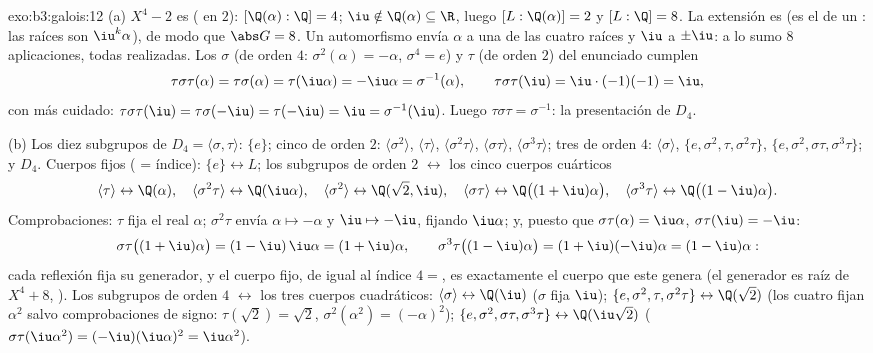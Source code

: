 \begin{solution}{exo:b3:galois:12}
(a) $X^4 - 2$ es 
( en $2$):
$[\Q(\alpha):\Q] = 4$; $\iu \notin \Q(\alpha) \subseteq \R$,
luego $[L : \Q(\alpha)] = 2$ y $[L:\Q] = 8$. La extensión es
 (es el
 de un
: las raíces son
$\iu^k\alpha$), de modo que $\abs G = 8$. Un automorfismo envía $\alpha$
a una de las cuatro raíces y $\iu$ a $\pm\iu$: a lo sumo $8$
aplicaciones, todas realizadas. Los $\sigma$ (de orden $4$:
$\sigma^2(\alpha) = -\alpha$, $\sigma^4 = e$) y $\tau$ (de orden $2$)
del enunciado cumplen
\[
\tau\sigma\tau(\alpha) = \tau\sigma(\alpha) =
\tau(\iu\alpha) = -\iu\alpha = \sigma^{-1}(\alpha),
\qquad \tau\sigma\tau(\iu) = \iu\cdot(-1)(-1) = \iu ,
\]
con más cuidado: $\tau\sigma\tau(\iu) = \tau\sigma(-\iu) =
\tau(-\iu) = \iu = \sigma^{-1}(\iu)$. Luego $\tau\sigma\tau =
\sigma^{-1}$: la presentación de $D_4$.

(b) Los diez subgrupos de $D_4 = \langle\sigma,
\tau\rangle$: $\{e\}$; cinco de orden $2$:
$\langle\sigma^2\rangle$, $\langle\tau\rangle$,
$\langle\sigma^2\tau\rangle$, $\langle\sigma\tau\rangle$,
$\langle\sigma^3\tau\rangle$; tres de orden $4$: $\langle\sigma\rangle$,
$\{e, \sigma^2, \tau,
\sigma^2\tau\}$, $\{e, \sigma^2, \sigma\tau,
\sigma^3\tau\}$; y $D_4$. Cuerpos fijos
( = índice):
$\{e\} \leftrightarrow L$; los subgrupos de orden $2$ $\leftrightarrow$
los cinco cuerpos cuárticos
\[
\langle\tau\rangle \leftrightarrow \Q(\alpha),\quad
\langle\sigma^2\tau\rangle \leftrightarrow \Q(\iu\alpha),
\quad
\langle\sigma^2\rangle \leftrightarrow \Q(\sqrt2, \iu),\quad
\langle\sigma\tau\rangle \leftrightarrow
\Q\bigl((1+\iu)\alpha\bigr),\quad
\langle\sigma^3\tau\rangle \leftrightarrow
\Q\bigl((1-\iu)\alpha\bigr) .
\]
Comprobaciones: $\tau$ fija el real $\alpha$; $\sigma^2\tau$ envía
$\alpha \mapsto -\alpha$ y $\iu \mapsto -\iu$, fijando $\iu\alpha$; y,
puesto que $\sigma\tau(\alpha) = \iu\alpha$,
$\sigma\tau(\iu) = -\iu$:
\[
\sigma\tau\bigl((1+\iu)\alpha\bigr) =
(1 - \iu)\,\iu\alpha = (1 + \iu)\alpha,
\qquad
\sigma^3\tau\bigl((1-\iu)\alpha\bigr) =
(1 + \iu)(-\iu)\alpha = (1 - \iu)\alpha :
\]
cada reflexión fija su generador, y el cuerpo fijo, de
 igual al índice $4 = $, es
exactamente el cuerpo que este genera (el generador es raíz de
$X^4 + 8$, ). Los
subgrupos de orden $4$ $\leftrightarrow$ los tres cuerpos cuadráticos:
$\langle\sigma\rangle \leftrightarrow \Q(\iu)$ ($\sigma$
fija $\iu$); $\{e, \sigma^2, \tau, \sigma^2\tau\}
\leftrightarrow \Q(\sqrt2)$ (los cuatro fijan $\alpha^2$ salvo
comprobaciones de signo: $\tau(\sqrt2) = \sqrt2$, $\sigma^2(\alpha^2) =
(-\alpha)^2$); $\{e, \sigma^2, \sigma\tau, \sigma^3\tau\}
\leftrightarrow \Q(\iu\sqrt2)$ ($\sigma\tau(\iu\alpha^2) =
(-\iu)(\iu\alpha)^2 = \iu\alpha^2$).


\end{solution}
